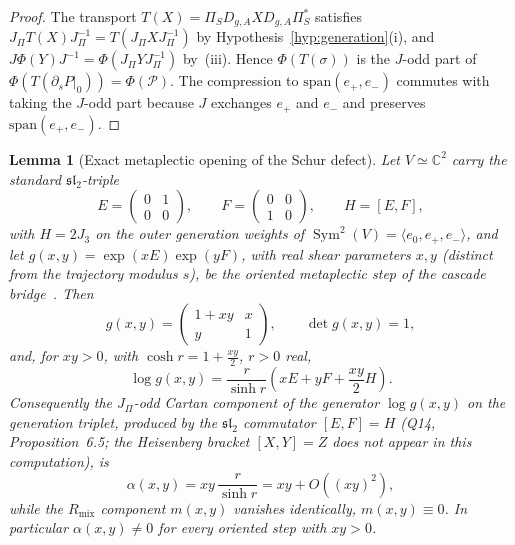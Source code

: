 \documentclass[11pt]{article}
\newtheorem{lemma}{Lemma}
\theoremstyle{definition}
\newcommand{\PiS}{\Pi_S}
\begin{document}
    \begin{proof}
      The transport $T(X)=\PiS D_{g,A}XD_{g,A}\PiS^{*}$ satisfies $J_\Pi T(X)J_\Pi^{-1}=T(J_\Pi XJ_\Pi^{-1})$ by
      Hypothesis~\ref{hyp:generation}(i), and $J\Phi(Y)J^{-1}=\Phi(J_\Pi YJ_\Pi^{-1})$ by~(iii).
      Hence $\Phi(T(\sigma))$ is the $J$-odd part of $\Phi(T(\partial_sP|_0))=\Phi(\mathcal P)$.
      The compression to $\mathrm{span}(e_+,e_-)$ commutes with taking the $J$-odd part because $J$ exchanges $e_+$ and
      $e_-$ and preserves $\mathrm{span}(e_+,e_-)$.
    \end{proof}

    \begin{lemma}[Exact metaplectic opening of the Schur defect]
      \label{lem:exact-schur-opening}
      Let $V\simeq\mathbb C^2$ carry the standard $\mathfrak{sl}_2$-triple
      \[
        E=\begin{pmatrix}0&1\\0&0\end{pmatrix},\qquad
        F=\begin{pmatrix}0&0\\1&0\end{pmatrix},\qquad
        H=[E,F],
      \]
      with $H=2J_3$ on the outer generation weights of $\operatorname{Sym}^2(V)=\langle e_0,e_+,e_-\rangle$, and let
      $g(x,y)=\exp(xE)\exp(yF)$, with real shear parameters $x,y$ (distinct from the trajectory modulus $s$), be the oriented metaplectic step of the cascade bridge~\cite{Beau2026q14}.
      Then
      \[
        g(x,y)=\begin{pmatrix}1+xy&x\\ y&1\end{pmatrix},\qquad\det g(x,y)=1,
      \]
      and, for $xy>0$, with $\cosh r=1+\tfrac{xy}{2}$, $r>0$ real,
      \[
        \log g(x,y)=\frac{r}{\sinh r}\left(xE+yF+\frac{xy}{2}H\right).
      \]
      Consequently the $J_\Pi$-odd Cartan component of the generator $\log g(x,y)$ on the generation triplet, produced
      by the $\mathfrak{sl}_2$ commutator $[E,F]=H$ (Q14, Proposition~6.5; the Heisenberg bracket $[X,Y]=Z$ does not
      appear in this computation), is
      \[
        \alpha(x,y)=xy\,\frac{r}{\sinh r}=xy+O\!\left((xy)^2\right),
      \]
      while the $R_{\mathrm{mix}}$ component $m(x,y)$ vanishes identically, $m(x,y)\equiv0$.
      In particular $\alpha(x,y)\neq0$ for every oriented step with $xy>0$.
    \end{lemma}
\end{document}
